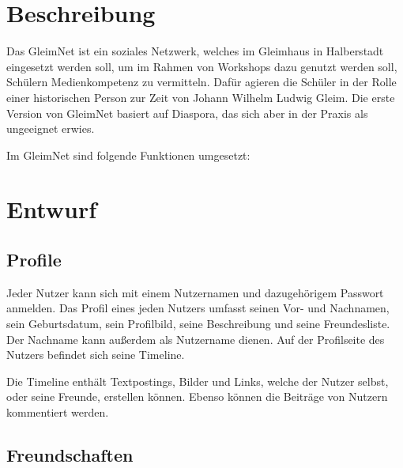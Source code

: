\documentclass[12pt]{article} %
\begin{document}

\tableofcontents %

\newpage %


\section{Beschreibung} %

Das GleimNet ist ein soziales Netzwerk, welches im Gleimhaus in Halberstadt eingesetzt werden soll, um im Rahmen von Workshops dazu genutzt werden soll, Schülern Medienkompetenz zu vermitteln. Dafür agieren die Schüler in der Rolle einer historischen Person zur Zeit von Johann Wilhelm Ludwig Gleim.
Die erste Version von GleimNet basiert auf Diaspora, das sich aber in der Praxis als ungeeignet erwies.

Im GleimNet sind folgende Funktionen umgesetzt:

\section{Entwurf}
\subsection{Profile}

Jeder Nutzer kann sich mit einem Nutzernamen und dazugehörigem  Passwort anmelden. Das Profil eines jeden Nutzers umfasst seinen Vor- und Nachnamen, sein Geburtsdatum, sein Profilbild, seine Beschreibung und seine Freundesliste. Der Nachname kann außerdem als Nutzername dienen. Auf der Profilseite des Nutzers befindet sich seine Timeline.

Die Timeline enthält Textpostings, Bilder und Links, welche der Nutzer selbst, oder seine Freunde, erstellen können. Ebenso können die Beiträge von Nutzern kommentiert werden.

\subsection{Freundschaften}
\end{document}
